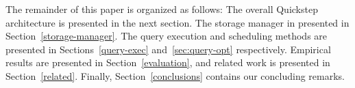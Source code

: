 

The remainder of this paper is organized as follows: The overall Quickstep architecture is presented in the next section. The storage manager in presented in Section~\ref{storage-manager}. The query execution and scheduling methods are presented in Sections~\ref{query-exec} and~\ref{sec:query-opt} respectively. Empirical results are presented in Section~\ref{evaluation}, and related work is presented in Section~\ref{related}. Finally, Section~\ref{conclusions} contains our concluding remarks.
